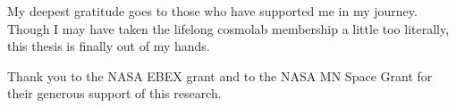 
My deepest gratitude goes to those who have supported me in my journey. 
Though I may have taken the lifelong cosmolab membership a little too literally, this thesis is finally out of my hands.  

Thank you to the NASA EBEX grant and to the NASA MN Space Grant for their generous support of this research. 


